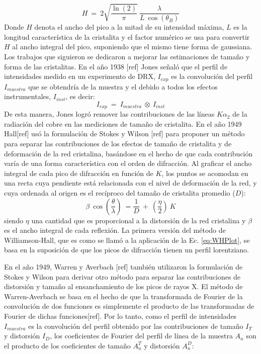 \begin{equation}
  H \ = \ 2 \sqrt{\frac{\ln(2)}{\pi}} \ \frac{\lambda}{L \ \cos(\theta_B)}
  \label{eq:Scherrer}
\end{equation}
\noindent
Donde $H$ denota el ancho del pico a la mitad de su intensidad máxima, $L$ es la longitud característica de la cristalita y el factor numérico se usa para convertir $H$ al ancho integral del pico, suponiendo que el mismo tiene forma de gaussiana. 
Los trabajos que siguieron se dedicaron a mejorar las estimaciones de tamaño y forma de las cristalitas. 
En el año 1938 [ref] Jones señaló que el perfil de intensidades medido en un experimento de DRX, $I_{exp}$ es la convolución del perfil $I_{muestra}$ que se obtendría de la muestra y el debido a todos los efectos instrumentales, $I_{inst}$, es decir:
\begin{equation}
  I_{exp} \ = \ I_{muestra} \ \otimes \ I_{inst}
  \label{eq:conv}
\end{equation}
\noindent
De esta manera, Jones logró remover las contribuciones de las líneas $K\alpha_2$ de la radiación del cobre en las mediciones de tamaño de cristalita. 
En el año 1949 Hall[ref] usó la formulación de Stokes y Wilson [ref] para proponer un método para separar las contribuciones de los efectos de tamaño de cristalita y de deformación de la red cristalina, basándose en el hecho de que cada contribución varía de una forma característica con el orden de difracción. 
Al graficar el ancho integral de cada pico de difracción en función de $K$, los puntos se acomodan en una recta cuya pendiente está relacionada con el nivel de deformación de la red, y cuya ordenada al origen es el recíproco del tamaño de cristalita promedio ($D$):
\begin{equation}
  \beta \ \cos(\frac{\theta}{\lambda}) \ = \frac{1}{D} \ + \ \left(\frac{\eta}{2}\right) \ K
  \label{eq:WHPlot}
\end{equation}
\noindent
siendo $\eta$ una cantidad que es proporcional a la distorsión de la red cristalina y $\beta$ es el ancho integral de cada reflexión. La primera versión del método de Williamson-Hall, que es como se llamó a la aplicación de la Ec. \ref{eq:WHPlot}, se basa en la suposición de que los picos de difracción tienen un perfil lorentziano.

En el año 1949, Warren y Averbach [ref] también utilizaron la formulación de Stokes y Wilson para derivar otro método para separar las contribuciones de distorsión y tamaño al ensanchamiento de los picos de rayos X. 
El método de Warren-Averbach se basa en el hecho de que la transformada de Fourier de la convolución de dos funciones es simplemente el producto de las transformadas de Fourier de dichas funciones[ref].
Por lo tanto, como el perfil de intensidades $I_{muestra}$ es la convolución del perfil obtenido por las contribuciones de tamaño $I_{T}$ y distorsión $I_{D}$, los coeficientes de Fourier del perfil de línea de la muestra $A_n$ son el producto de los coeficientes de tamaño $A_n^T$ y distorsión $A_n^D$:

